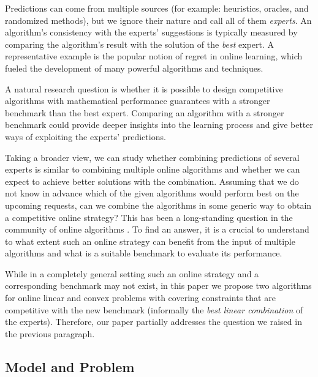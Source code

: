 Predictions can come from multiple sources (for example: heuristics, oracles, and randomized methods), but we ignore their nature and call all of them \emph{experts}.  An algorithm's consistency with the experts' suggestions is typically measured by comparing the algorithm's result with the solution of the \emph{best} expert. A representative example is the popular notion of regret in online learning, which fueled the development of many powerful algorithms and techniques.

A natural research question is whether it is possible to design competitive algorithms with mathematical performance guarantees with a stronger benchmark than the best expert. Comparing an algorithm with a stronger benchmark could provide deeper insights into the learning process and give better ways of exploiting the experts' predictions.

Taking a broader view, we can study whether combining predictions of several experts is similar to combining multiple online algorithms and whether we can expect to achieve better solutions with the combination. Assuming that we do not know in advance which of the given algorithms would perform best on the upcoming requests, can we combine the algorithms in some generic way to obtain a competitive online strategy? This has been a long-standing question in the community of online algorithms \cite{AzarBroder93:On-line-Choice,BlumBurch00:On-line-Learning}. To find an answer, it is a crucial to understand to what extent such an online strategy can benefit from the input of multiple algorithms and what is a suitable benchmark to evaluate its performance.

While in a completely general setting such an online strategy and a corresponding benchmark may not exist, in this paper we propose
two algorithms for online linear and convex problems with covering constraints that are competitive with the new benchmark (informally the \emph{best linear combination} of the experts). Therefore, our paper partially addresses the question we raised in the previous paragraph.

\subsection{Model and Problem}

